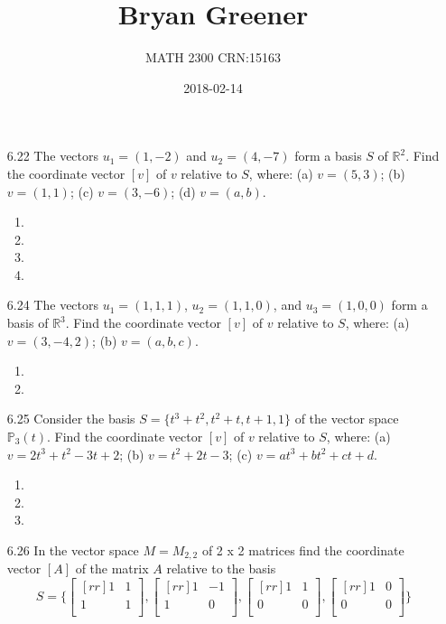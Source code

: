 \documentclass[12pt]{article}
\title{Bryan Greener}
\author{MATH 2300 CRN:15163}
\date{2018-02-14}
\begin{document}
\maketitle

\TabPositions{4cm}

\begin{enumerate}
\item[6.22] The vectors $u_1=(1,-2)$ and $u_2=(4,-7)$ form a basis $S$ of $\mathbb{R}^2$. Find the coordinate vector $[v]$ of $v$ relative to $S$, where: (a) $v=(5,3)$; (b) $v=(1,1)$; (c) $v=(3,-6)$; (d) $v=(a,b)$.
	\begin{enumerate}
	\item
	\item
	\item
	\item
	\end{enumerate}
\item[6.24] The vectors $u_1=(1,1,1)$, $u_2=(1,1,0)$, and $u_3=(1,0,0)$ form a basis of $\mathbb{R}^3$. Find the coordinate vector $[v]$ of $v$ relative to $S$, where: (a) $v=(3,-4,2)$; (b) $v=(a,b,c)$.
	\begin{enumerate}
	\item
	\item
	\end{enumerate}
\item[6.25] Consider the basis $S=\{t^3+t^2, t^2+t, t+1, 1\}$ of the vector space $\mathbb{P}_3(t)$. Find the coordinate vector $[v]$ of $v$ relative to $S$, where: (a) $v=2t^3+t^2-3t+2$; (b) $v=t^2+2t-3$; (c) $v=at^3+bt^2+ct+d$.
	\begin{enumerate}
	\item
	\item
	\item
	\end{enumerate}
\item[6.26] In the vector space $M=M_{2,2}$ of 2 x 2 matrices find the coordinate vector $[A]$ of the matrix $A$ relative to the basis
\[ S=\{\begin{bmatrix}[rr]1&1\\1&1\\\end{bmatrix},\begin{bmatrix}[rr]1&-1\\1&0\\\end{bmatrix},\begin{bmatrix}[rr]1&1\\0&0\\\end{bmatrix},\begin{bmatrix}[rr]1&0\\0&0\\\end{bmatrix}\} \]

\end{enumerate}
\end{document}
